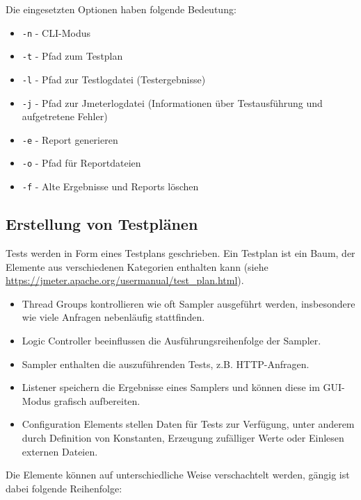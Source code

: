 Die eingesetzten Optionen haben folgende Bedeutung:

\begin{itemize}
    \item \texttt{-n} - CLI-Modus
    \item \texttt{-t} - Pfad zum Testplan
    \item \texttt{-l} - Pfad zur Testlogdatei (Testergebnisse)
    \item \texttt{-j} - Pfad zur Jmeterlogdatei (Informationen über Testausführung und aufgetretene Fehler)
    \item \texttt{-e} - Report generieren
    \item \texttt{-o} - Pfad für Reportdateien
    \item \texttt{-f} - Alte Ergebnisse und Reports löschen
\end{itemize}

\subsection{Erstellung von Testplänen}

Tests werden in Form eines Testplans geschrieben.
Ein Testplan ist ein Baum, der Elemente aus verschiedenen Kategorien enthalten kann (siehe \url{https://jmeter.apache.org/usermanual/test_plan.html}).

\begin{itemize}
    \item Thread Groups kontrollieren wie oft Sampler ausgeführt werden, insbesondere wie viele Anfragen nebenläufig stattfinden.
    \item Logic Controller beeinflussen die Ausführungsreihenfolge der Sampler.
    \item Sampler enthalten die auszuführenden Tests, z.B. HTTP-Anfragen.
    \item Listener speichern die Ergebnisse eines Samplers und können diese im GUI-Modus grafisch aufbereiten.
    \item Configuration Elements stellen Daten für Tests zur Verfügung, unter anderem durch Definition von Konstanten,
          Erzeugung zufälliger Werte oder Einlesen externen Dateien.
\end{itemize}


Die Elemente können auf unterschiedliche Weise verschachtelt werden, gängig ist dabei folgende Reihenfolge:

